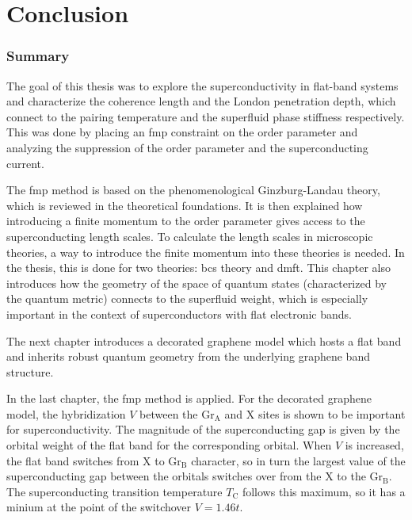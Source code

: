 \documentclass[../main.tex]{subfiles}
\begin{document}
	
\chapter{Conclusion}\label{ch:conclusion}

\subsection*{Summary}

The goal of this thesis was to explore the superconductivity in flat-band systems and characterize the coherence length and the London penetration depth, which connect to the pairing temperature and the superfluid phase stiffness respectively.
This was done by placing an \gls{fmp} constraint on the order parameter and analyzing the suppression of the order parameter and the superconducting current.

The \gls{fmp} method is based on the phenomenological Ginzburg-Landau theory, which is reviewed in the theoretical foundations.
It is then explained how introducing a finite momentum to the order parameter gives access to the superconducting length scales.
To calculate the length scales in microscopic theories, a way to introduce the finite momentum into these theories is needed.
In the thesis, this is done for two theories: \gls{bcs} theory and \gls{dmft}.
This chapter also introduces how the geometry of the space of quantum states (characterized by the quantum metric) connects to the superfluid weight, which is especially important in the context of superconductors with flat electronic bands.

The next chapter introduces a decorated graphene model which hosts a flat band and inherits robust quantum geometry from the underlying graphene band structure.

In the last chapter, the \gls{fmp} method is applied.
For the decorated graphene model, the hybridization \(V\) between the \(\mathrm{Gr}_{\mathrm{A}}\) and \(\mathrm{X}\) sites is shown to be important for superconductivity.
The magnitude of the superconducting gap is given by the orbital weight of the flat band for the corresponding orbital.
When \(V\) is increased, the flat band switches from \(\mathrm{X}\) to \(\mathrm{Gr}_{\mathrm{B}}\) character, so in turn the largest value of the superconducting gap between the orbitals switches over from the \(\mathrm{X}\) to the \(\mathrm{Gr}_{\mathrm{B}}\).
The superconducting transition temperature \(T_{\mathrm{C}}\) follows this maximum, so it has a minium at the point of the switchover \(V = 1.46t\).
\end{document}
